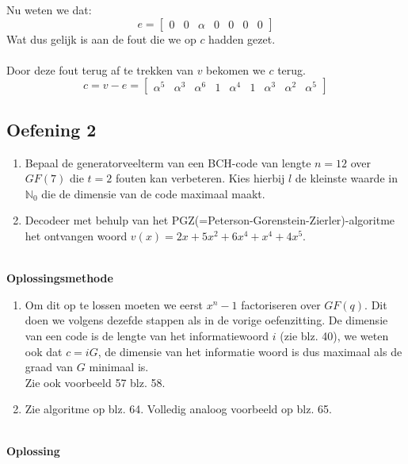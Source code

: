 \documentclass[11pt,a4paper,titlepage]{article}
\begin{document}
\begin{enumerate}[label=(\alph*)]
		Nu weten we dat:
			$$e = \begin{bmatrix}0&0 &\alpha&0&0&0&0\end{bmatrix}$$
		Wat dus gelijk is aan de fout die we op $c$ hadden gezet.\\ \\
		Door deze fout terug af te trekken van $v$ bekomen we $c$ terug.
			$$c = v-e = \begin{bmatrix}\alpha ^5&\alpha ^3&\alpha ^6&1&\alpha ^4&1&\alpha ^3&\alpha ^2&\alpha ^5\end{bmatrix}$$
\end{enumerate}
\subsection{Oefening 2}
\begin{enumerate}[label=(\alph*)]
	\item Bepaal de generatorveelterm van een BCH-code van lengte $n = 12$ over $GF(7)$ die $t=2$ fouten kan verbeteren. Kies hierbij $l$ de kleinste waarde in $\mathbb{N}_0$ die de dimensie van de code maximaal maakt.
	\item Decodeer met behulp van het PGZ(=Peterson-Gorenstein-Zierler)-algoritme het ontvangen woord $v(x) = 2x + 5x^2 + 6x^4 + x^4 + 4x^5$.
\end{enumerate}
\noindent \\ \textbf{Oplossingsmethode}
\begin{enumerate}[label=(\alph*)]
	\item Om dit op te lossen moeten we eerst $x^n-1$ factoriseren over $GF(q)$. Dit doen we volgens dezefde stappen als in de vorige oefenzitting.
		De dimensie van een code is de lengte van het informatiewoord $i$ (zie blz. 40), we weten ook dat $c = iG$, de dimensie van het informatie woord is dus maximaal als de graad van $G$ minimaal is.\\ Zie ook voorbeeld 57 blz. 58.
	\item Zie algoritme op blz. 64. Volledig analoog voorbeeld op blz. 65.
\end{enumerate}
\noindent \\ \textbf{Oplossing}
\end{document}
